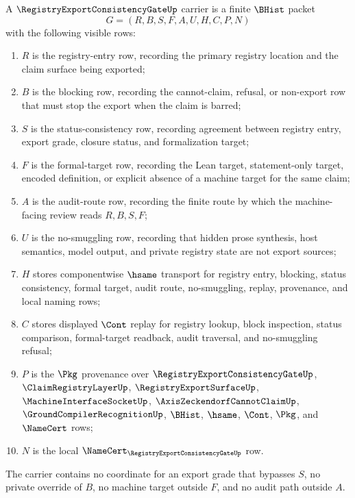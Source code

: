 \begin{definition}
\label{def:registry-export-consistency-gate-carrier}
A $\RegistryExportConsistencyGateUp$ carrier is a finite $\BHist$ packet
$$
G=(R,B,S,F,A,U,H,C,P,N)
$$
with the following visible rows:
\begin{enumerate}
\item $R$ is the registry-entry row, recording the primary registry location and the claim surface being exported;
\item $B$ is the blocking row, recording the cannot-claim, refusal, or non-export row that must stop the export when the claim is barred;
\item $S$ is the status-consistency row, recording agreement between registry entry, export grade, closure status, and formalization target;
\item $F$ is the formal-target row, recording the Lean target, statement-only target, encoded definition, or explicit absence of a machine target for the same claim;
\item $A$ is the audit-route row, recording the finite route by which the machine-facing review reads $R,B,S,F$;
\item $U$ is the no-smuggling row, recording that hidden prose synthesis, host semantics, model output, and private registry state are not export sources;
\item $H$ stores componentwise $\hsame$ transport for registry entry, blocking, status consistency, formal target, audit route, no-smuggling, replay, provenance, and local naming rows;
\item $C$ stores displayed $\Cont$ replay for registry lookup, block inspection, status comparison, formal-target readback, audit traversal, and no-smuggling refusal;
\item $P$ is the $\Pkg$ provenance over $\RegistryExportConsistencyGateUp$, $\ClaimRegistryLayerUp$, $\RegistryExportSurfaceUp$, $\MachineInterfaceSocketUp$, $\AxisZeckendorfCannotClaimUp$, $\GroundCompilerRecognitionUp$, $\BHist$, $\hsame$, $\Cont$, $\Pkg$, and $\NameCert$ rows;
\item $N$ is the local $\NameCert_{\RegistryExportConsistencyGateUp}$ row.
\end{enumerate}
The carrier contains no coordinate for an export grade that bypasses $S$, no private override of $B$, no machine target outside $F$, and no audit path outside $A$.
\end{definition}

